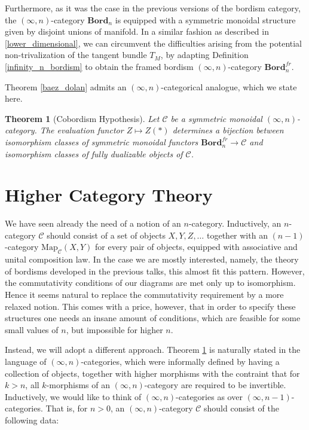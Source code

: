 \documentclass[a4paper,11pt]{article}
\newcommand{\ccal}{\mathcal{C}}
\theoremstyle{plain}
\newtheorem{thm}{Theorem}[section]
\theoremstyle{definition}
\theoremstyle{remark}
\begin{document}
Furthermore, as it was the case in the previous versions of the bordism category, the $(\infty, n)$-category $\textbf{Bord}_n$ is equipped with a symmetric monoidal structure given by disjoint unions of manifold. In a similar fashion as described in \ref{lower_dimensional}, we can circumvent the difficulties arising from the potential non-trivalization of the tangent bundle $T_M$, by adapting Definition \ref{infinity_n_bordism} to obtain the framed bordism $(\infty, n)$-category $\textbf{Bord}_n^{fr}$. 

Theorem \ref{baez_dolan} admits an $(\infty, n)$-categorical analogue, which we state here. 



\begin{thm}[Cobordism Hypothesis]
\label{cobordism_hypothesis}
Let $\ccal$ be a symmetric monoidal $(\infty, n)$-category. The evaluation functor $Z \mapsto Z(*)$ determines a bijection between isomorphism classes of symmetric monoidal functors $\textbf{Bord}_n^{fr} \to \ccal$ and isomorphism classes of fully dualizable objects of $\ccal$. 
\end{thm}



\section{Higher Category Theory}
\label{section_2}
 
We have seen already the need of a notion of an $n$-category. Inductively, an $n$-category $\ccal$ should consist of a set of objects $X, Y, Z, \dots$ together with an $(n-1)$-category $\text{Map}_{\ccal}(X,Y)$ for every pair of objects, equipped with associative and unital composition law. In the case we are mostly interested, namely, the theory of bordisms developed in the previous talks, this almost fit this pattern. However, the commutativity conditions of our diagrams are met only up to isomorphism. Hence it seems natural to replace the commutativity requirement by a more relaxed notion. This comes with a price, however, that in order to specify these structures one needs an insane amount of conditions, which are feasible for some small values of $n$, but impossible for higher $n$.

Instead, we will adopt a different approach. Theorem \ref{cobordism_hypothesis} is naturally stated in the language of $(\infty, n)$-categories, which were informally defined by having a collection of objects, together with higher morphisms with the contraint that for $k >n$, all $k$-morphisms of an $(\infty, n)$-category are required to be invertible. Inductively, we would like to think of $(\infty, n)$-categories as  over $(\infty, n-1)$-categories. That is, for $n >0$, an $(\infty, n)$-category $\ccal$ should consist of the following data: 
\end{document}
